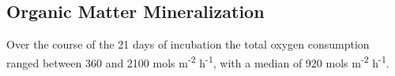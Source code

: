 \subsection{Organic Matter Mineralization}

Over the course of the 21 days of incubation the total oxygen consumption ranged between 360 and 2100 \mu mols m\textsuperscript{-2} h\textsuperscript{-1}, with a median of 920 \mu mols m\textsuperscript{-2} h\textsuperscript{-1}.  